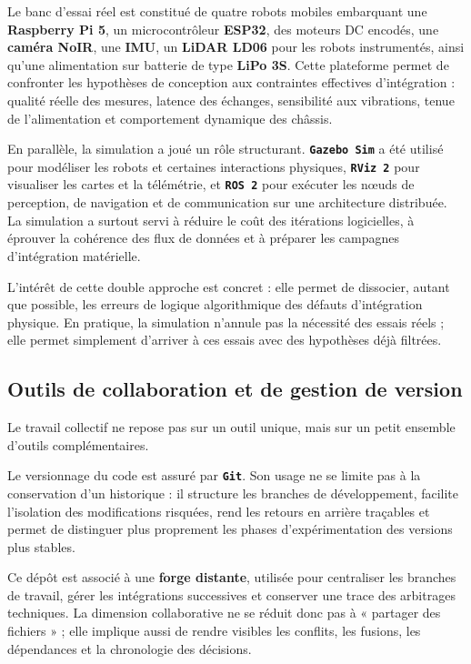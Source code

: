 \documentclass[11pt,a4paper]{report}
\newcommand{\kw}[1]{\textbf{#1}}
\newcommand{\outil}[1]{\textbf{\texttt{#1}}}
\begin{document}
Le banc d’essai réel est constitué de quatre robots mobiles embarquant une \kw{Raspberry Pi 5}, un microcontrôleur \kw{ESP32}, des moteurs DC encodés, une \kw{caméra NoIR}, une \kw{IMU}, un \kw{LiDAR LD06} pour les robots instrumentés, ainsi qu’une alimentation sur batterie de type \kw{LiPo 3S}. Cette plateforme permet de confronter les hypothèses de conception aux contraintes effectives d’intégration : qualité réelle des mesures, latence des échanges, sensibilité aux vibrations, tenue de l’alimentation et comportement dynamique des châssis.

En parallèle, la simulation a joué un rôle structurant. \outil{Gazebo Sim} a été utilisé pour modéliser les robots et certaines interactions physiques, \outil{RViz 2} pour visualiser les cartes et la télémétrie, et \outil{ROS 2} pour exécuter les nœuds de perception, de navigation et de communication sur une architecture distribuée. La simulation a surtout servi à réduire le coût des itérations logicielles, à éprouver la cohérence des flux de données et à préparer les campagnes d’intégration matérielle.

L’intérêt de cette double approche est concret : elle permet de dissocier, autant que possible, les erreurs de logique algorithmique des défauts d’intégration physique. En pratique, la simulation n’annule pas la nécessité des essais réels ; elle permet simplement d’arriver à ces essais avec des hypothèses déjà filtrées.

\subsection{Outils de collaboration et de gestion de version}

Le travail collectif ne repose pas sur un outil unique, mais sur un petit ensemble d’outils complémentaires.

Le versionnage du code est assuré par \outil{Git}. Son usage ne se limite pas à la conservation d’un historique : il structure les branches de développement, facilite l’isolation des modifications risquées, rend les retours en arrière traçables et permet de distinguer plus proprement les phases d’expérimentation des versions plus stables.

Ce dépôt est associé à une \kw{forge distante}, utilisée pour centraliser les branches de travail, gérer les intégrations successives et conserver une trace des arbitrages techniques. La dimension collaborative ne se réduit donc pas à « partager des fichiers » ; elle implique aussi de rendre visibles les conflits, les fusions, les dépendances et la chronologie des décisions.
\end{document}
